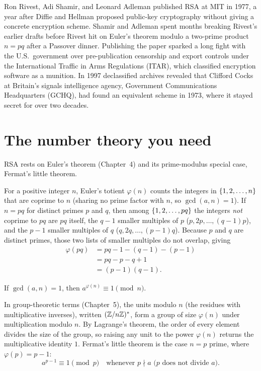 \begin{historybox}
Ron Rivest, Adi Shamir, and Leonard Adleman published RSA at MIT in 1977, a year after Diffie and Hellman proposed public-key cryptography without giving a concrete encryption scheme. Shamir and Adleman spent months breaking Rivest's earlier drafts before Rivest hit on Euler's theorem modulo a two-prime product $n = pq$ after a Passover dinner. Publishing the paper sparked a long fight with the U.S.\ government over pre-publication censorship and export controls under the International Traffic in Arms Regulations (ITAR), which classified encryption software as a munition. In 1997 declassified archives revealed that Clifford Cocks at Britain's signals intelligence agency, Government Communications Headquarters (GCHQ), had found an equivalent scheme in 1973, where it stayed secret for over two decades.
\end{historybox}

\section{The number theory you need}
\label{ch19:numbertheory}

RSA rests on Euler's theorem (Chapter~4) and its prime-modulus special case, Fermat's little theorem.

For a positive integer $n$, Euler's totient $\varphi(n)$ counts the integers in $\{1,2,\dots,n\}$ that are coprime to $n$ (sharing no prime factor with $n$, so $\gcd(a,n)=1$). If $n=pq$ for distinct primes $p$ and $q$, then among $\{1,2,\dots,pq\}$ the integers \emph{not} coprime to $pq$ are $pq$ itself, the $q-1$ smaller multiples of $p$ ($p, 2p, \dots, (q-1)p$), and the $p-1$ smaller multiples of $q$ ($q, 2q, \dots, (p-1)q$). Because $p$ and $q$ are distinct primes, those two lists of smaller multiples do not overlap, giving
\begin{align*}
  \varphi(pq) &= pq - 1 - (q-1) - (p-1) \\
              &= pq - p - q + 1 \\
              &= (p-1)(q-1).
\end{align*}

\begin{theorem}[Euler]
\label{ch19:euler}
If $\gcd(a,n)=1$, then $a^{\varphi(n)} \equiv 1 \pmod{n}$.
\end{theorem}

In group-theoretic terms (Chapter~5), the units modulo $n$ (the residues with multiplicative inverses), written $(\mathbb{Z}/n\mathbb{Z})^{*}$, form a group of size $\varphi(n)$ under multiplication modulo $n$. By Lagrange's theorem, the order of every element divides the size of the group, so raising any unit to the power $\varphi(n)$ returns the multiplicative identity $1$. Fermat's little theorem is the case $n=p$ prime, where $\varphi(p)=p-1$:
\[
  a^{p-1}\equiv 1 \pmod p \quad\text{whenever } p\nmid a \text{ ($p$ does not divide $a$)}.
\]

